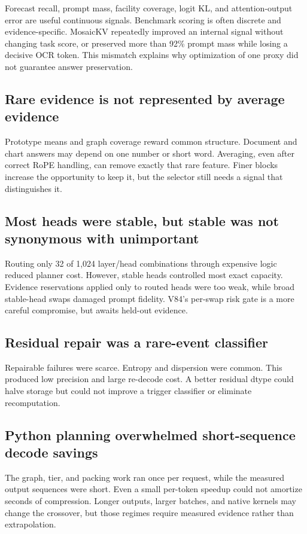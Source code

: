 \documentclass[11pt]{article}
\begin{document}
Forecast recall, prompt mass, facility coverage, logit KL, and attention-output error are useful
continuous signals.  Benchmark scoring is often discrete and evidence-specific.  MosaicKV
repeatedly improved an internal signal without changing task score, or preserved more than 92\%
prompt mass while losing a decisive OCR token.  This mismatch explains why optimization of one
proxy did not guarantee answer preservation.

\subsection{Rare evidence is not represented by average evidence}

Prototype means and graph coverage reward common structure.  Document and chart answers may depend
on one number or short word.  Averaging, even after correct RoPE handling, can remove exactly that
rare feature.  Finer blocks increase the opportunity to keep it, but the selector still needs a
signal that distinguishes it.

\subsection{Most heads were stable, but stable was not synonymous with unimportant}

Routing only 32 of 1,024 layer/head combinations through expensive logic reduced planner cost.
However, stable heads controlled most exact capacity.  Evidence reservations applied only to
routed heads were too weak, while broad stable-head swaps damaged prompt fidelity.  V84's per-swap
risk gate is a more careful compromise, but awaits held-out evidence.

\subsection{Residual repair was a rare-event classifier}

Repairable failures were scarce.  Entropy and dispersion were common.  This produced low precision
and large re-decode cost.  A better residual dtype could halve storage but could not improve a
trigger classifier or eliminate recomputation.

\subsection{Python planning overwhelmed short-sequence decode savings}

The graph, tier, and packing work ran once per request, while the measured output sequences were
short.  Even a small per-token speedup could not amortize seconds of compression.  Longer outputs,
larger batches, and native kernels may change the crossover, but those regimes require measured
evidence rather than extrapolation.
\end{document}
